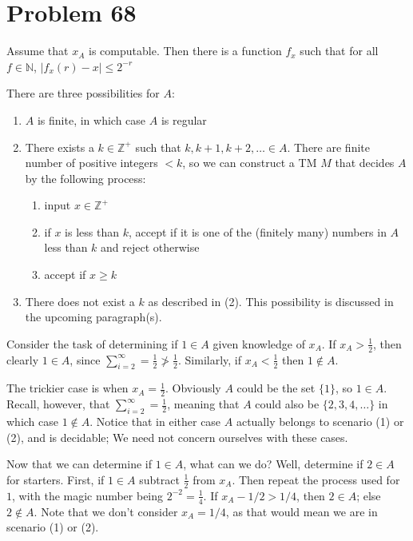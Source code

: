 \documentclass[11pt]{article}
\begin{document}
\section*{Problem 68}

Assume that $x_A$ is computable. Then there is a function $f_x$ such that for all $f \in \mathbb{N}$, $|f_x(r)-x| \leq 2^{-r}$

There are three possibilities for $A$:
\begin{enumerate}[(1)]
	\item $A$ is finite, in which case $A$ is regular
	\item There exists a $k \in \mathbb{Z}^+$ such that $k, k+1, k+2, \ldots \in A$.
	There are finite number of positive integers $< k$, so we can construct a TM $M$ that decides $A$ by the following process:
	\begin{enumerate}
		\item input $x \in \mathbb{Z}^+$
		\item if $x$ is less than $k$, accept if it is one of the (finitely many) numbers in $A$ less than $k$ and reject otherwise
		\item accept if $x \geq k$
	\end{enumerate}
	\item There does not exist a $k$ as described in (2). This possibility is discussed in the upcoming paragraph(s).
\end{enumerate}

Consider the task of determining if $1 \in A$ given knowledge of $x_A$.
If $x_A > \frac{1}{2}$, then clearly $1 \in A$, since $\sum _{i=2} ^{\infty} = \frac{1}{2} \not> \frac{1}{2}$.
Similarly, if $x_A < \frac{1}{2}$ then $1 \notin A$.

The trickier case is when $x_A = \frac{1}{2}$.
Obviously $A$ could be the set $\{1\}$, so $1 \in A$.
Recall, however, that $\sum _{i=2} ^{\infty} = \frac{1}{2}$, meaning that $A$ could also be $\{2,3,4,\ldots \}$ in which case $1 \notin A$.
Notice that in either case $A$ actually belongs to scenario (1) or (2), and is decidable; We need not concern ourselves with these cases.

Now that we can determine if $1 \in A$, what can we do?
Well, determine if $2 \in A$ for starters.
First, if $1 \in A$ subtract $\frac{1}{2}$ from $x_A$.
Then repeat the process used for $1$, with the magic number being $2^{-2} = \frac{1}{4}$.
If $x_A - 1/2 > 1/4$, then $2 \in A$; else $2 \notin A$.
Note that we don't consider $x_A = 1/4$, as that would mean we are in scenario (1) or (2). 
\end{document}
